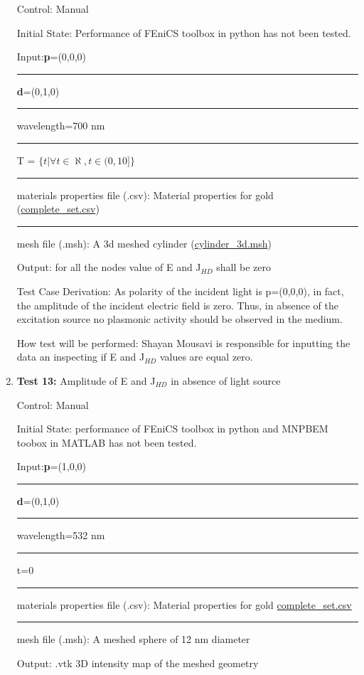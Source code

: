 \documentclass[12pt, titlepage]{article}
\begin{document}
\begin{enumerate}
Control: Manual 

Initial State: Performance of FEniCS toolbox in python has not been tested. 

Input:\textbf{p}=(0,0,0)\\
\rule{1.3cm}{0pt}\textbf{d}=(0,1,0)\\
\rule{1.3cm}{0pt}wavelength=700 nm\\ 
\rule{1.3cm}{0pt}T = $\{t| \forall t \in \aleph, t \in (0,10]\}$\\
\rule{1.3cm}{0pt}materials properties file (.csv): Material properties for gold (\href{https://github.com/shmouses/SPDFM/blob/master/src/TestCase/complete\_set.csv}{complete\_set.csv})\\
\rule{1.3cm}{0pt}mesh file (.msh): A 3d meshed cylinder (\href{https://github.com/shmouses/SPDFM/blob/master/src/TestCase/cylinder\_3d.msh}{cylinder\_3d.msh})

Output: for all the nodes value of E and J$_{HD}$ shall be zero 

Test Case Derivation: As polarity of the incident light is p=(0,0,0), in fact, the amplitude of the incident electric field is zero. Thus, in absence of the excitation source no plasmonic activity should be observed in the medium. 

How test will be performed: Shayan Mousavi is responsible for inputting the data an inspecting if E and J$_{HD}$ values are equal zero.  


\item{\textbf{Test 13:} Amplitude of E and J$_{HD}$ in absence of light source\\}

Control: Manual 

Initial State:  performance of FEniCS toolbox in python and MNPBEM toobox in MATLAB has not been tested. 

Input:\textbf{p}=(1,0,0)\\
\rule{1.1cm}{0pt}\textbf{d}=(0,1,0)\\
\rule{1.1cm}{0pt}wavelength=532 nm\\ 
\rule{1.1cm}{0pt}t=0\\
\rule{1.1cm}{0pt}materials properties file (.csv): Material properties for gold  \href{https://github.com/shmouses/SPDFM/blob/master/src/TestCase/complete\_set.csv}{complete\_set.csv}\\
\rule{1.1cm}{0pt}mesh file (.msh): A meshed sphere of 12 nm diameter

Output: .vtk 3D intensity map of the meshed geometry


\end{enumerate}
\end{document}
